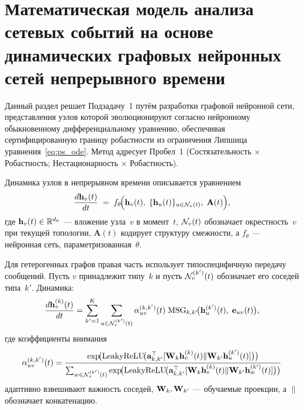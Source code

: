 \section{Математическая модель анализа сетевых событий на основе динамических графовых нейронных сетей непрерывного времени}
\label{sec:ct_tgnn}

Данный раздел решает Подзадачу~1 путём разработки графовой нейронной сети, представления узлов которой эволюционируют согласно нейронному обыкновенному дифференциальному уравнению, обеспечивая сертифицированную границу робастности из ограничения Липшица уравнения~\eqref{eq:ps_ode}. Метод адресует Пробел~1 (Состязательность $\times$ Робастность; Нестационарность $\times$ Робастность).

Динамика узлов в непрерывном времени описывается уравнением
\begin{equation}
\frac{d\mathbf{h}_v(t)}{dt}
\;=\; f_\theta\!\Bigl(\mathbf{h}_v(t),\;\{\mathbf{h}_u(t)\}_{u\in\mathcal{N}_v(t)},\;\mathbf{A}(t)\Bigr),
\label{eq:ct_tgnn_homo}
\end{equation}
где $\mathbf{h}_v(t)\in\mathbb{R}^{d_h}$ --- вложение узла~$v$ в момент~$t$, $\mathcal{N}_v(t)$ обозначает окрестность~$v$ при текущей топологии, $\mathbf{A}(t)$ кодирует структуру смежности, а $f_\theta$ --- нейронная сеть, параметризованная~$\theta$.

Для гетерогенных графов правая часть использует типоспецифичную передачу сообщений. Пусть $v$ принадлежит типу~$k$ и пусть $\mathcal{N}_v^{(k')}(t)$ обозначает его соседей типа~$k'$. Динамика:
\begin{equation}
\frac{d\mathbf{h}_v^{(k)}(t)}{dt}
= \sum_{k'=1}^{K}\sum_{u\in\mathcal{N}_v^{(k')}(t)}
  \alpha_{uv}^{(k,k')}(t)\;\mathrm{MSG}_{k,k'}\!\bigl(
    \mathbf{h}_u^{(k')}(t),\;\mathbf{e}_{uv}(t)\bigr),
\label{eq:ct_tgnn_hetero}
\end{equation}
где коэффициенты внимания~\cite{Velickovic2018}
\begin{equation}
\alpha_{uv}^{(k,k')}(t)
= \frac{
  \exp\!\bigl(\mathrm{LeakyReLU}\!\bigl(
    \mathbf{a}_{k,k'}^\top
    [\mathbf{W}_k\mathbf{h}_v^{(k)}(t)\|\mathbf{W}_{k'}\mathbf{h}_u^{(k')}(t)]
  \bigr)\bigr)
}{
  \sum_{w\in\mathcal{N}_v^{(k')}(t)}
  \exp\!\bigl(\mathrm{LeakyReLU}\!\bigl(
    \mathbf{a}_{k,k'}^\top
    [\mathbf{W}_k\mathbf{h}_v^{(k)}(t)\|\mathbf{W}_{k'}\mathbf{h}_w^{(k')}(t)]
  \bigr)\bigr)
}
\label{eq:ct_tgnn_attn}
\end{equation}
адаптивно взвешивают важность соседей, $\mathbf{W}_k,\mathbf{W}_{k'}$ --- обучаемые проекции, а $\|$ обозначает конкатенацию.

